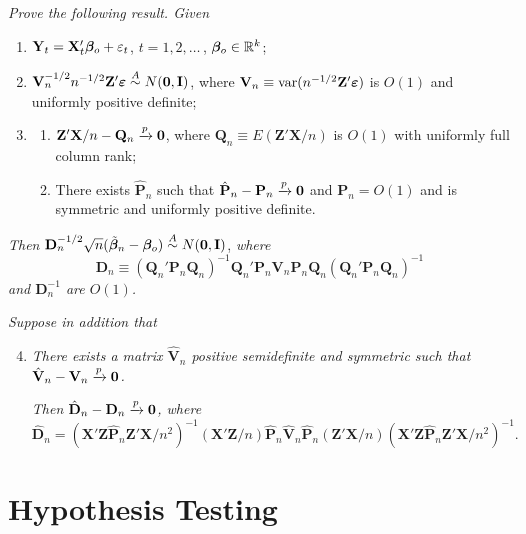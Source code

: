\begin{exercises}
\item\label{ex:4.26} \textit{Prove the following result. Given}
\begin{enumerate}[label=(\roman*)]
\item $\mathbf{Y}_t = \mathbf{X}_t'\boldsymbol{\beta}_o + \varepsilon_t$, \quad $t = 1, 2, \ldots$\,, $\boldsymbol{\beta}_o \in \mathbb{R}^k$;
\item $\mathbf{V}_n^{-1/2}n^{-1/2}\mathbf{Z}'\boldsymbol{\varepsilon} \overset{A}{\sim} N(\mathbf{0}, \mathbf{I})$, where $\mathbf{V}_n \equiv \mathrm{var}(n^{-1/2}\mathbf{Z}'\boldsymbol{\varepsilon})$ is $O(1)$ and uniformly positive definite;
\item \begin{enumerate}[label=(\alph*)]
\item $\mathbf{Z}'\mathbf{X}/n - \mathbf{Q}_n \xrightarrow{p} \mathbf{0}$, where $\mathbf{Q}_n \equiv E(\mathbf{Z}'\mathbf{X}/n)$ is $O(1)$ with uniformly full column rank;
\item There exists $\hat{\mathbf{P}}_n$ such that $\hat{\mathbf{P}}_n - \mathbf{P}_n \xrightarrow{p} \mathbf{0}$ and $\mathbf{P}_n = O(1)$ and is symmetric and uniformly positive definite.
\end{enumerate}
\end{enumerate}
\emph{Then} $\mathbf{D}_n^{-1/2}\sqrt{n}(\tilde{\boldsymbol{\beta}}_n - \boldsymbol{\beta}_o) \overset{A}{\sim} N(\mathbf{0}, \mathbf{I})$, \emph{where}
\[
\mathbf{D}_n \equiv (\mathbf{Q}_n'\mathbf{P}_n\mathbf{Q}_n)^{-1}\mathbf{Q}_n'\mathbf{P}_n\mathbf{V}_n\mathbf{P}_n\mathbf{Q}_n(\mathbf{Q}_n'\mathbf{P}_n\mathbf{Q}_n)^{-1}
\]
\emph{and $\mathbf{D}_n^{-1}$ are $O(1)$.}

\emph{Suppose in addition that}
\begin{enumerate}[label=(\roman*)]
\setcounter{enumi}{3}
\item \emph{There exists a matrix $\hat{\mathbf{V}}_n$ positive semidefinite and symmetric such
that $\hat{\mathbf{V}}_n - \mathbf{V}_n \xrightarrow{p} \mathbf{0}$.}

\emph{Then $\hat{\mathbf{D}}_n - \mathbf{D}_n \xrightarrow{p} \mathbf{0}$, where}
\[
\hat{\mathbf{D}}_n = (\mathbf{X}'\mathbf{Z}\hat{\mathbf{P}}_n\mathbf{Z}'\mathbf{X}/n^2)^{-1}(\mathbf{X}'\mathbf{Z}/n)\hat{\mathbf{P}}_n\hat{\mathbf{V}}_n\hat{\mathbf{P}}_n(\mathbf{Z}'\mathbf{X}/n)(\mathbf{X}'\mathbf{Z}\hat{\mathbf{P}}_n\mathbf{Z}'\mathbf{X}/n^2)^{-1}.
\]
\end{enumerate}
\end{exercises}

\section{Hypothesis Testing}\label{sec:hypothesis-testing}

